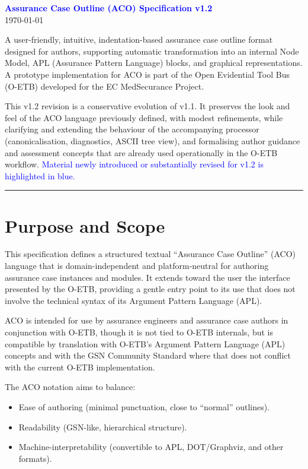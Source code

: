 \documentclass[11pt]{article}
\begin{document}
\begin{center}
{\LARGE \textbf{\textcolor{blue}{Assurance Case Outline (ACO) Specification v1.2}}}\\[0.5em]
\today
\end{center}

A user-friendly, intuitive, indentation-based assurance case outline format designed for authors, supporting automatic transformation into an internal Node Model, APL (Assurance Pattern Language) blocks, and graphical representations.
A prototype implementation for ACO is part of the Open Evidential Tool Bus (O-ETB) developed for the EC MedSecurance Project.

This v1.2 revision is a conservative evolution of v1.1. It preserves the look and feel of the ACO language previously defined, with modest refinements, while clarifying and extending the behaviour of the accompanying processor (canonicalisation, diagnostics, ASCII tree view), and formalising author guidance and assessment concepts that are already used operationally in the O-ETB workflow.
\textcolor{blue}{Material newly introduced or substantially revised for v1.2 is highlighted in blue.}

\bigskip
\hrule
\bigskip

\tableofcontents

\section{Purpose and Scope}

This specification defines a structured textual ``Assurance Case Outline'' (ACO) language that is domain-independent and platform-neutral for authoring assurance case instances and modules. It extends toward the user the interface presented by the O-ETB, providing a gentle entry point to its use that does not involve the technical syntax of its Argument Pattern Language (APL).


ACO is intended for use by assurance engineers and assurance case authors in conjunction with O-ETB, though it is not tied to O-ETB internals, but is compatible by translation with O-ETB's Argument Pattern Language (APL) concepts and with the GSN Community Standard where that does not conflict with the current O-ETB implementation.

The ACO notation aims to balance:
\begin{itemize}[leftmargin=2em]
  \item Ease of authoring (minimal punctuation, close to ``normal'' outlines).
  \item Readability (GSN-like, hierarchical structure).
  \item Machine-interpretability (convertible to APL, DOT/Graphviz, and other formats).
\end{itemize}
\end{document}
